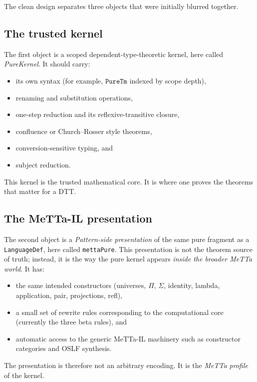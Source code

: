\documentclass[11pt]{article}
\begin{document}
The clean design separates three objects that were initially blurred together.

\subsection{The trusted kernel}

The first object is a scoped dependent-type-theoretic kernel, here called \emph{PureKernel}. It should carry:

\begin{itemize}
  \item its own syntax (for example, \(\texttt{PureTm}\) indexed by scope depth),
  \item renaming and substitution operations,
  \item one-step reduction and its reflexive-transitive closure,
  \item confluence or Church--Rosser style theorems,
  \item conversion-sensitive typing, and
  \item subject reduction.
\end{itemize}

This kernel is the trusted mathematical core. It is where one proves the theorems that matter for a DTT.

\subsection{The MeTTa-IL presentation}

The second object is a \emph{Pattern-side presentation} of the same pure fragment as a \texttt{LanguageDef}, here called \texttt{mettaPure}. This presentation is not the theorem source of truth; instead, it is the way the pure kernel appears \emph{inside the broader MeTTa world}. It has:

\begin{itemize}
  \item the same intended constructors (universes, \(\Pi\), \(\Sigma\), identity, lambda, application, pair, projections, refl),
  \item a small set of rewrite rules corresponding to the computational core (currently the three beta rules), and
  \item automatic access to the generic MeTTa-IL machinery such as constructor categories and OSLF synthesis.
\end{itemize}

The presentation is therefore not an arbitrary encoding. It is the \emph{MeTTa profile} of the kernel.
\end{document}
